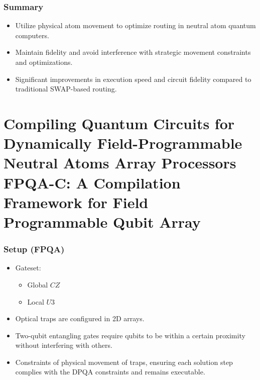 \documentclass[18 pt]{beamer}
\begin{document}
\begin{frame}
    \frametitle{Summary}
    \begin{itemize}
        \item Utilize physical atom movement to optimize routing in neutral atom quantum computers.
        \item Maintain fidelity and avoid interference with strategic movement constraints and optimizations.
        \item Significant improvements in execution speed and circuit fidelity compared to traditional SWAP-based routing.
    \end{itemize}
\end{frame}

\section{Compiling Quantum Circuits for Dynamically Field-Programmable Neutral Atoms Array Processors\\FPQA-C: A Compilation Framework for Field Programmable Qubit Array}
\begin{frame}
    \frametitle{Setup (FPQA)}
    \begin{itemize}
        \item Gateset:
        \begin{itemize}
            \item Global $CZ$
            \item Local $U3$
        \end{itemize}
        \item Optical traps are configured in 2D arrays.
        \item Two-qubit entangling gates require qubits to be within a certain proximity without interfering with others.
        \item Constraints of physical movement of traps, ensuring each solution step complies with the DPQA constraints and remains executable.
    \end{itemize}
\end{frame}
\end{document}

